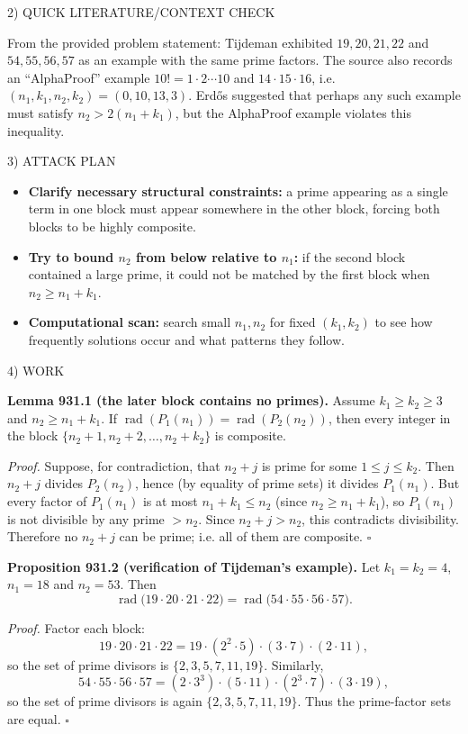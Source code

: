 2) QUICK LITERATURE/CONTEXT CHECK

From the provided problem statement: Tijdeman exhibited
\(19,20,21,22\) and \(54,55,56,57\) as an example with the same prime factors. The source also records an ``AlphaProof'' example
\(10!=1\cdot2\cdots 10\) and \(14\cdot15\cdot16\), i.e. $(n_1,k_1,n_2,k_2)=(0,10,13,3)$. Erd\H{o}s suggested that perhaps any such example must satisfy $n_2>2(n_1+k_1)$, but the AlphaProof example violates this inequality.

3) ATTACK PLAN

\begin{itemize}
\item \textbf{Clarify necessary structural constraints:} a prime appearing as a single term in one block must appear somewhere in the other block, forcing both blocks to be highly composite.
\item \textbf{Try to bound $n_2$ from below relative to $n_1$:} if the second block contained a large prime, it could not be matched by the first block when $n_2\ge n_1+k_1$.
\item \textbf{Computational scan:} search small $n_1,n_2$ for fixed $(k_1,k_2)$ to see how frequently solutions occur and what patterns they follow.
\end{itemize}

4) WORK

\textbf{Lemma 931.1 (the later block contains no primes).}
Assume $k_1\ge k_2\ge 3$ and $n_2\ge n_1+k_1$.
If $\operatorname{rad}(P_1(n_1))=\operatorname{rad}(P_2(n_2))$, then every integer in the block $\{n_2+1,n_2+2,\dots,n_2+k_2\}$ is composite.

\emph{Proof.}
Suppose, for contradiction, that $n_2+j$ is prime for some $1\le j\le k_2$.
Then $n_2+j$ divides $P_2(n_2)$, hence (by equality of prime sets) it divides $P_1(n_1)$.
But every factor of $P_1(n_1)$ is at most $n_1+k_1\le n_2$ (since $n_2\ge n_1+k_1$), so $P_1(n_1)$ is not divisible by any prime $>n_2$.
Since $n_2+j>n_2$, this contradicts divisibility. Therefore no $n_2+j$ can be prime; i.e. all of them are composite.
\hfill$\square$

\medskip
\textbf{Proposition 931.2 (verification of Tijdeman's example).}
Let $k_1=k_2=4$, $n_1=18$ and $n_2=53$. Then
\[
\operatorname{rad}\bigl(19\cdot20\cdot21\cdot22\bigr)=\operatorname{rad}\bigl(54\cdot55\cdot56\cdot57\bigr).
\]

\emph{Proof.}
Factor each block:
\[
19\cdot20\cdot21\cdot22 = 19\cdot(2^2\cdot5)\cdot(3\cdot7)\cdot(2\cdot11),
\]
so the set of prime divisors is $\{2,3,5,7,11,19\}$.
Similarly,
\[
54\cdot55\cdot56\cdot57 = (2\cdot3^3)\cdot(5\cdot11)\cdot(2^3\cdot7)\cdot(3\cdot19),
\]
so the set of prime divisors is again $\{2,3,5,7,11,19\}$.
Thus the prime-factor sets are equal.
\hfill$\square$

